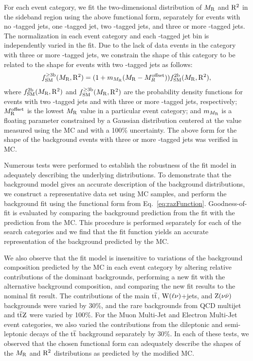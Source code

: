 For each event category, we fit the two-dimensional distribution of 
$M_\mathrm{R}$ and $\mathrm{R}^2$ in the sideband region using the
above functional form, separately for events with no \PQb-tagged jets, one
\PQb-tagged jet, two \PQb-tagged jets, and three or more \PQb-tagged jets. The
normalization in each event category and each \PQb-tagged jet bin is
independently varied in the fit. Due to the lack of data events in the category
with three or more \PQb-tagged jets, we constrain
the shape of this category to be related to the shape for events with two
\PQb-tagged jets as follows:
\begin{equation}
  f^{\geq 3\mathrm{b}}_{\mathrm{SM}}(M_\mathrm{R}, \mathrm{R}^2)  = (1+m_{M_\mathrm{R}}(M_\mathrm{R} - M^{\mathrm{offset}}_R))f^{2\mathrm{b}}_{\mathrm{SM}}(M_\mathrm{R}, \mathrm{R}^2),
\label{eq:3btagFunction}
\end{equation}
where $f^{2\mathrm{b}}_{\mathrm{SM}}(M_\mathrm{R}, \mathrm{R}^2)$ and $f^{\geq 3\mathrm{b}}_{\mathrm{SM}}(M_\mathrm{R}, \mathrm{R}^2)$ are the
probability density functions for events with
two \PQb-tagged jets and with three or more \PQb-tagged jets,
respectively; $M_\mathrm{R}^{\mathrm{offset}}$ is the lowest $M_\mathrm{R}$ value in a particular
event category; and $m_{M_\mathrm{R}}$ is a floating parameter constrained by a Gaussian distribution
centered at the value measured using the MC and with a
100\% uncertainty. The above form for the shape of the background events 
with three or more \PQb-tagged jets was verified in MC.

Numerous tests were performed to establish the robustness of the fit
model in adequately describing the underlying distributions. To
demonstrate that the background model gives an accurate description of the 
background distributions, we construct a representative
data set using MC samples, and perform the background fit using
the functional form from Eq.~\ref{eq:razFunction}. Goodness-of-fit is
evaluated by comparing the background prediction from the fit with the
prediction from the MC. This procedure is performed
separately for each of the search categories and we find
that the fit function yields an accurate representation of the
background predicted by the MC.

We also observe that the fit model is insensitive to variations of the background
composition predicted by the MC in each event category by altering
relative contributions of the dominant backgrounds, performing a
new fit with the alternative background composition, and comparing
the new fit results to the nominal fit result. The contributions
of the main $\mathrm{t}\overline{\mathrm{t}}$, $\mathrm{W}(\ell\nu)$+jets, and $\mathrm{Z}(\nu\bar\nu)$ backgrounds 
were varied by 30\%, and the rare backgrounds from QCD multijet and $\mathrm{t}\overline{\mathrm{t}}\mathrm{Z}$ 
were varied by 100\%. For the Muon Multi-Jet and Electron Multi-Jet event categories,
we also varied the contributions from the dileptonic and semi-leptonic decays
of the $\mathrm{t}\overline{\mathrm{t}}$ background separately by 30\%. In each of these tests, we 
observed that the chosen functional form can adequately describe the shapes of 
the $M_\mathrm{R}$ and $\mathrm{R}^2$ distributions as predicted by the modified MC.

